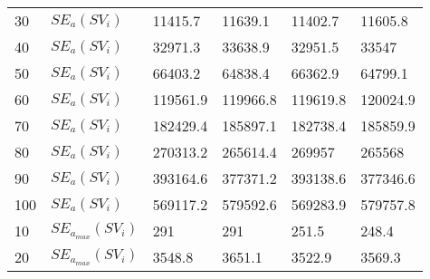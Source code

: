 \begin{table}[H]
\begin{tabular}{l l | l l | l l}
		30                                                          & $SE_{a}(SV_i)$                                                    & 11415.7                   & 11639.1                   & 11402.7                 & 11605.8                 \\
		40                                                          & $SE_{a}(SV_i)$                                                    & 32971.3                   & 33638.9                   & 32951.5                 & 33547                   \\
		50                                                          & $SE_{a}(SV_i)$                                                    & 66403.2                   & 64838.4                   & 66362.9                 & 64799.1                 \\
		60                                                          & $SE_{a}(SV_i)$                                                    & 119561.9                  & 119966.8                  & 119619.8                & 120024.9                \\
		70                                                          & $SE_{a}(SV_i)$                                                    & 182429.4                  & 185897.1                  & 182738.4                & 185859.9                \\
		80                                                          & $SE_{a}(SV_i)$                                                    & 270313.2                  & 265614.4                  & 269957                  & 265568                  \\
		90                                                          & $SE_{a}(SV_i)$                                                    & 393164.6                  & 377371.2                  & 393138.6                & 377346.6                \\
		100                                                         & $SE_{a}(SV_i)$                                                    & 569117.2                  & 579592.6                  & 569283.9                & 579757.8                \\
		10                                                          &  $SE_{a_{max}}(SV_i)$                                                        & 291                       & 291                       & 251.5                   & 248.4                   \\
		20                                                          &  $SE_{a_{max}}(SV_i)$                                                        & 3548.8                    & 3651.1                    & 3522.9                  & 3569.3                  \\

\end{tabular}
\end{table}
